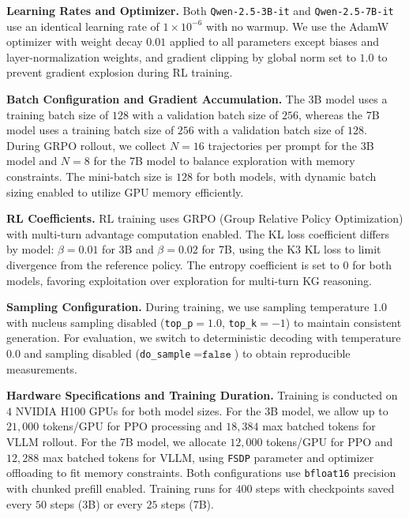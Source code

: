 \noindent \textbf{Learning Rates and Optimizer.}
Both \texttt{Qwen-2.5-3B-it} and \texttt{Qwen-2.5-7B-it} use an identical learning rate of $1\times10^{-6}$ with no warmup. We use the AdamW optimizer with weight decay $0.01$ applied to all parameters except biases and layer-normalization weights, and gradient clipping by global norm set to $1.0$ to prevent gradient explosion during RL training.

\noindent \textbf{Batch Configuration and Gradient Accumulation.}
The 3B model uses a training batch size of $128$ with a validation batch size of $256$, whereas the 7B model uses a training batch size of $256$ with a validation batch size of $128$. During GRPO rollout, we collect $N=16$ trajectories per prompt for the 3B model and $N=8$ for the 7B model to balance exploration with memory constraints. The mini-batch size is $128$ for both models, with dynamic batch sizing enabled to utilize GPU memory efficiently.

\noindent \textbf{RL Coefficients.}
RL training uses GRPO (Group Relative Policy Optimization) with multi-turn advantage computation enabled. The KL loss coefficient differs by model: $\beta=0.01$ for 3B and $\beta=0.02$ for 7B, using the K3 KL loss to limit divergence from the reference policy. The entropy coefficient is set to $0$ for both models, favoring exploitation over exploration for multi-turn KG reasoning.

\noindent \textbf{Sampling Configuration.}
During training, we use sampling temperature $1.0$ with nucleus sampling disabled (\texttt{top\_p}$=1.0$, \texttt{top\_k}$=-1$) to maintain consistent generation. For evaluation, we switch to deterministic decoding with temperature $0.0$ and sampling disabled (\texttt{do\_sample}$=\texttt{false}$) to obtain reproducible measurements.

\noindent \textbf{Hardware Specifications and Training Duration.}
Training is conducted on $4$ NVIDIA H100 GPUs for both model sizes. For the 3B model, we allow up to $21{,}000$ tokens/GPU for PPO processing and $18{,}384$ max batched tokens for VLLM rollout. For the 7B model, we allocate $12{,}000$ tokens/GPU for PPO and $12{,}288$ max batched tokens for VLLM, using \texttt{FSDP} parameter and optimizer offloading to fit memory constraints. Both configurations use \texttt{bfloat16} precision with chunked prefill enabled. Training runs for $400$ steps with checkpoints saved every $50$ steps (3B) or every $25$ steps (7B).
